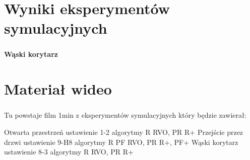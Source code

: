 \section*{Wyniki eksperymentów symulacyjnych}
\begin{frame}
\frametitle{\secname}
\framesubtitle{Wąski korytarz}

\begin{figure}[ht] %
	\captionsetup[subfigure]{labelformat=empty}
	\centering
\end{figure}


\end{frame}

\section*{Materiał wideo}
\begin{frame}
\frametitle{\secname}

Tu powstaje film 1min z eksperymentów symulacyjnych który będzie zawierał:

Otwarta przestrzeń ustawienie 1-2 algorytmy R RVO, PR R+
Przejście przez drzwi ustawienie 9-H8 algorytmy R PF RVO, PR R+, PF+
Wąski korytarz ustawienie 8-3 algorytmy R RVO, PR R+
\end{frame}


